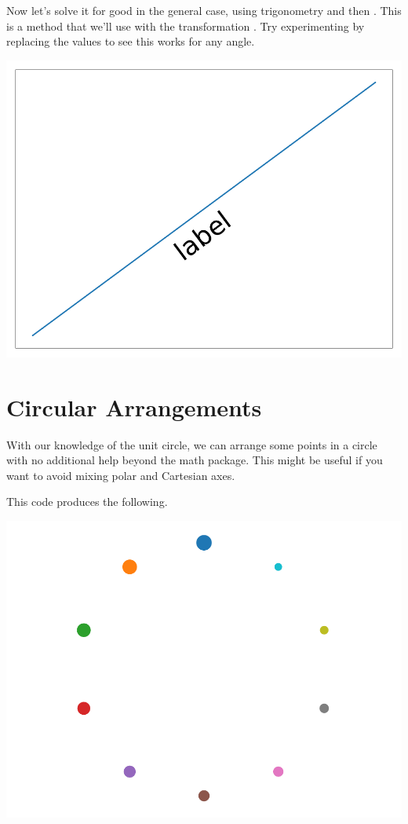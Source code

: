 Now let's solve it for good in the general case, using trigonometry and then . This is a method that we'll use with the transformation . Try experimenting by replacing the  values to see this works for any angle.  


\begin{center}
    \includegraphics[width = .6\textwidth]{figures/mathplots/slope-label.pdf}
\end{center}

\section{Circular Arrangements}\label{sec:circarrange}

With our knowledge of the unit circle, we can arrange some points in a circle with no additional help beyond the math package. This might be useful if you want to avoid mixing polar and Cartesian axes. 


This code produces the following.

\begin{center}
    \includegraphics[width = .6\textwidth]{figures/mathplots/circle.pdf}
\end{center}


